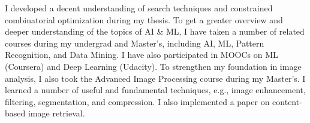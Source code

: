 \documentclass[12pt]{article}
\begin{document}
\begin{comment}I developed a decent understanding of search techniques and constrained combinatorial optimization during my thesis. To get a greater overview and deeper understanding of the topics of AI \& ML, I have taken a number of related courses during my undergrad and Master's, including AI, ML, Pattern Recognition, and Data Mining. I have also participated in MOOCs on ML (Coursera) and Deep Learning (Udacity). To strengthen my foundation in image analysis, I also took the Advanced Image Processing course. In this course, I learned a number of useful and fundamental techniques, e.g., image enhancement, filtering, segmentation, and compression. I also implemented a paper on content-based image retrieval.

I developed a decent understanding of search techniques and constrained combinatorial optimization during my thesis. To get a greater overview and deeper understanding of the topics of AI \& ML, I have taken a number of related courses during my undergrad and Master's. My interest towards Image and Natural Language understanding piqued during one of my Master's projects. I surveyed the literature of bidirectional image-sentence search, searching images with sentence descriptions (and vice versa), and analyzed three of the state-of-the-art methods. I also proposed a two-stage approach that unlike the previous methods decouples object detection within the images from the inference of their inherent semantic relations. In the first phase, the representation of the objects in the images are learned in a joint ``Object embedding space'' to have close proximities with their matching words (e.g., an image of dog will have similar ``Object'' representation of the word ``dog''). In the next step, the ``Semantic'' representation of the images and sentences are learned leveraging the object representations. 
\end{comment}
I developed a decent understanding of search techniques and constrained combinatorial optimization during my thesis. To get a greater overview and deeper understanding of the topics of AI \& ML, I have taken a number of related courses during my undergrad and Master's, including AI, ML, Pattern Recognition, and Data Mining. I have also participated in MOOCs on ML (Coursera) and Deep Learning (Udacity). To strengthen my foundation in image analysis, I also took the Advanced Image Processing course during my Master's. I learned a number of useful and fundamental techniques, e.g., image enhancement, filtering, segmentation, and compression. I also implemented a paper on content-based image retrieval. 
\end{document}
